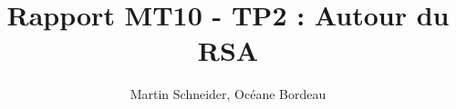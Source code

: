 \documentclass[titlepage]{article}
\title{Rapport MT10 - TP2 : Autour du RSA}
\author{Martin Schneider, Océane Bordeau}
\begin{document}
    \maketitle
    \tableofcontents
    \pagebreak
\end{document}
